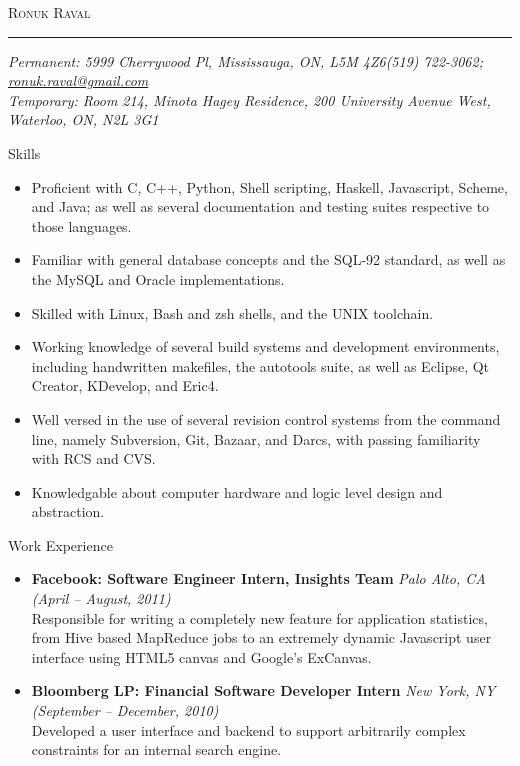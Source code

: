 \documentclass[11pt,oneside]{article}
\makeatletter
\newcommand{\name}{Ronuk Raval}
\newcommand{\permaddr}{5999 Cherrywood Pl, Mississauga, ON, L5M 4Z6}
\newcommand{\tempaddr}{
    Room 214,
    Minota Hagey Residence,
    200 University Avenue West,
    Waterloo, ON, N2L 3G1
}
\newcommand{\phone}{(519) 722-3062}
\newcommand{\email}{ronuk.raval@gmail.com}
\newcommand{\website}{http://zeroindexed.com}
\newcommand{\bigname}[1]{
    \begin{center}\fontfamily{phv}\selectfont\Huge\scshape#1\end{center}
}
\newcommand{\respara}[1]{
    \vspace{4pt}
    {\fontfamily{phv} \selectfont \Large #1} \\
    \vspace{4pt}
    \hspace{19pt}
}
\newenvironment{ressection}[1]{
    \respara{#1}
    \begin{itemize}
    \vspace{-20pt}
}{
    \end{itemize}
}
\newcommand{\resitem}[1]{
    \vspace{-4pt}
    \item \begin{flushleft} #1 \end{flushleft}
}
\newcommand{\resbigitem}[3]{
    \item
    \textbf{#1} \hfill \textit{#2} \\
    #3
}
\makeatother
\begin{document}
 \selectfont

\bigname{\name}

\vspace{-8pt} \rule{\textwidth}{1pt}

\vspace{-1pt} {\small\itshape Permanent: \permaddr \hfill \phone; \href{mailto:\email}{\email}\\
    Temporary: \tempaddr}%

\vspace{8 pt}



\begin{ressection}{Skills}

    \resitem{Proficient with C, C++, Python, Shell scripting, Haskell,
        Javascript, Scheme, and Java; as well as several documentation and testing
        suites respective to those languages.}

    \resitem{Familiar with general database concepts and the SQL-92 standard, as well
        as the MySQL and Oracle implementations.}

    \resitem{Skilled with Linux, Bash and zsh shells, and the UNIX toolchain.}

    \resitem{Working knowledge of several build systems and development environments,
        including handwritten makefiles, the autotools suite, as well as Eclipse,
        Qt Creator, KDevelop, and Eric4.}

    \resitem{Well versed in the use of several revision control systems from the command
        line, namely Subversion, Git, Bazaar, and Darcs, with passing familiarity with
        RCS and CVS.}

    \resitem{Knowledgable about computer hardware and logic level design and abstraction.}

\end{ressection}

\begin{ressection}{Work Experience}

    \resbigitem{Facebook: Software Engineer Intern, Insights Team}
        {Palo Alto, CA (April -- August, 2011)}
        {Responsible for writing a completely new feature for application
        statistics, from Hive based MapReduce jobs to an extremely dynamic
        Javascript user interface using HTML5 canvas and Google's ExCanvas.}

    \resbigitem{Bloomberg LP: Financial Software Developer Intern}
        {New York, NY (September -- December, 2010)}
        {Developed a user interface and backend to support arbitrarily complex
        constraints for an internal search engine.}

\end{ressection}
\end{document}
